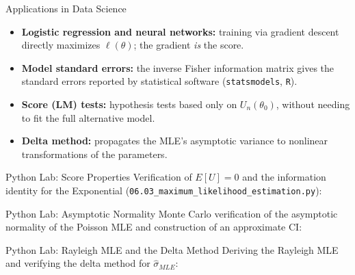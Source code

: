\documentclass[aspectratio=169,xcolor={dvipsnames,table}]{beamer}
\begin{document}
\begin{frame}{Applications in Data Science}
	\vspace{-0.1cm}
	\begin{itemize}\itemsep=0.1cm
		\item \textbf{Logistic regression and neural networks:} training via gradient descent directly maximizes $\ell(\theta)$; the gradient \emph{is} the score. \pause
		\item \textbf{Model standard errors:} the inverse Fisher information matrix gives the standard errors reported by statistical software (\texttt{statsmodels}, \texttt{R}). \pause
		\item \textbf{Score (LM) tests:} hypothesis tests based only on $U_n(\theta_0)$, without needing to fit the full alternative model. \pause
		\item \textbf{Delta method:} propagates the MLE's asymptotic variance to nonlinear transformations of the parameters.
	\end{itemize}
\end{frame}

\begin{frame}[fragile]{Python Lab: Score Properties}
	\vspace{-0.05cm}
	\scriptsize
	Verification of $E[U]=0$ and the information identity for the Exponential (\texttt{06.03\_maximum\_likelihood\_estimation.py}):
	{
	}
\end{frame}

\begin{frame}[fragile]{Python Lab: Asymptotic Normality}
	\vspace{-0.05cm}
	\scriptsize
	Monte Carlo verification of the asymptotic normality of the Poisson MLE and construction of an approximate CI:
	{
	}
\end{frame}

\begin{frame}[fragile]{Python Lab: Rayleigh MLE and the Delta Method}
	\vspace{-0.05cm}
	\scriptsize
	Deriving the Rayleigh MLE and verifying the delta method for $\hat\sigma_{MLE}$:
	{
	}
\end{frame}
\end{document}
